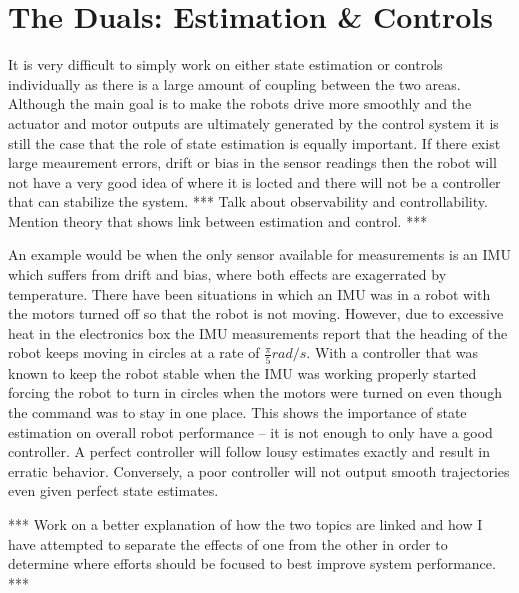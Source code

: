 \section{The Duals: Estimation \& Controls}
\label{sec:duals}
It is very difficult to simply work on either state estimation or controls individually as there is a large amount of coupling between the two areas. Although the main goal is to make the robots drive more smoothly and the actuator and motor outputs are ultimately generated by the control system it is still the case that the role of state estimation is equally important. If there exist large meaurement errors, drift or bias in the sensor readings then the robot will not have a very good idea of where it is locted and there will not be a controller that can stabilize the system. *** Talk about observability and controllability. Mention theory that shows link between estimation and control. ***

An example would be when the only sensor available for measurements is an IMU which suffers from drift and bias, where both effects are exagerrated by temperature. There have been situations in which an IMU was in a robot with the motors turned off so that the robot is not moving. However, due to excessive heat in the electronics box the IMU measurements report that the heading of the robot keeps moving in circles at a rate of $\frac{\pi}{5} rad/s$. With a controller that was known to keep the robot stable when the IMU was working properly started forcing the robot to turn in circles when the motors were turned on even though the command was to stay in one place. This shows the importance of state estimation on overall robot performance -- it is not enough to only have a good controller. A perfect controller will follow lousy estimates exactly and result in erratic behavior. Conversely, a poor controller will not output smooth trajectories even given perfect state estimates.

*** Work on a better explanation of how the two topics are linked and how I have attempted to separate the effects of one from the other in order to determine where efforts should be focused to best improve system performance. ***
